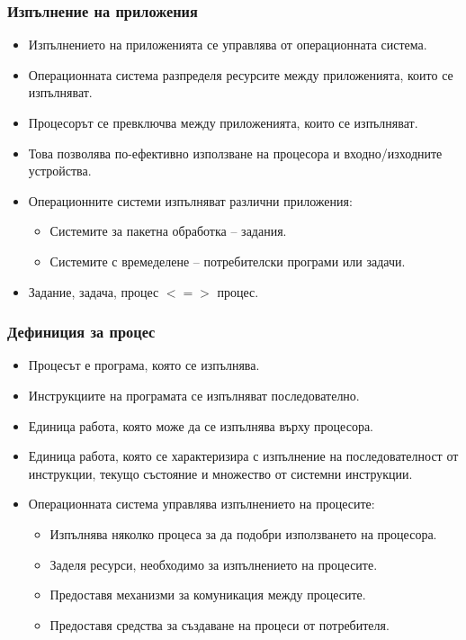 \documentclass[ignorenonframetext, hyperref=unicode]{beamer}
\begin{document}
\begin{frame}\frametitle{Изпълнение на приложения}
\begin{itemize}
\item Изпълнението на приложенията се управлява от операционната система.
\item Операционната система разпределя ресурсите между приложенията, които се
изпълняват.
\item Процесорът се превключва между приложенията, които се изпълняват.
\item Това позволява по-ефективно използване на процесора и входно/изходните
устройства.
\item Операционните системи изпълняват различни приложения:
\begin{itemize}
  \item Системите за пакетна обработка -- задания.
  \item Системите с времеделене -- потребителски програми или задачи.
\end{itemize}
\item Задание, задача, процес $<=>$ процес.
\end{itemize}
\end{frame}

\begin{frame}\frametitle{Дефиниция за процес}
\begin{itemize}
\item Процесът е програма, която се изпълнява.
\item Инструкциите на програмата се изпълняват последователно.
\item Единица работа, която може да се изпълнява върху процесора.
\item Единица работа, която се характеризира с изпълнение на последователност от
инструкции, текущо състояние и множество от системни инструкции.
\item Операционната система управлява изпълнението на процесите:
\begin{itemize}
	\item Изпълнява няколко процеса за да подобри използването на процесора.
	\item Заделя ресурси, необходимо за изпълнението на процесите.
	\item Предоставя механизми за комуникация между процесите.
	\item Предоставя средства за създаване на процеси от потребителя.
\end{itemize}
\end{itemize}
\end{frame}
\end{document}
